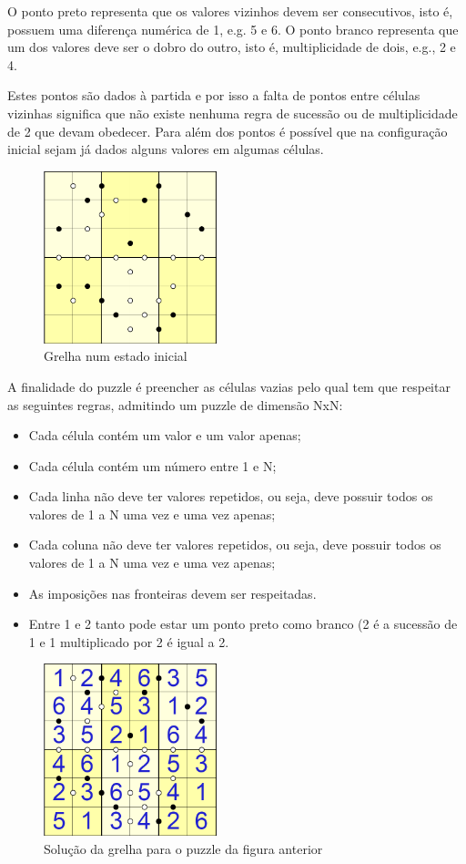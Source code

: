 \documentclass[runningheads,a4paper]{llncs}
\begin{document}
O ponto preto representa que os valores vizinhos devem ser consecutivos, isto é, possuem uma diferença numérica de 1, e.g. 5 e 6.
O ponto branco representa que um dos valores deve ser o dobro do outro, isto é, multiplicidade de dois, e.g., 2 e 4.

Estes pontos são dados à partida e por isso a falta de pontos entre células vizinhas significa que não existe nenhuma regra de sucessão ou de multiplicidade de 2 que devam obedecer. Para além dos pontos é possível que na configuração inicial sejam já dados alguns valores em algumas células.

\begin{figure}
\centering
\includegraphics[height=5cm]{res/emptyGrid}
\caption{Grelha num estado inicial}
\label{fig:emptyGrid}
\end{figure}

A finalidade do puzzle é preencher as células vazias pelo qual tem que respeitar as seguintes regras, admitindo um puzzle de dimensão NxN:
\begin{itemize}
  \item Cada célula contém um valor e um valor apenas;
  \item Cada célula contém um número entre 1 e N;
  \item Cada linha não deve ter valores repetidos, ou seja, deve possuir todos os valores de 1 a N uma vez e uma vez apenas;
  \item Cada coluna não deve ter valores repetidos, ou seja, deve possuir todos os valores de 1 a N uma vez e uma vez apenas;
  \item As imposições nas fronteiras devem ser respeitadas.
  \item Entre 1 e 2 tanto pode estar um ponto preto como branco (2 é a sucessão de 1 e 1 multiplicado por 2 é igual a 2.
\end{itemize}

\begin{figure}
\centering
\includegraphics[height=5cm]{res/filledGrid}
\caption{Solução da grelha para o puzzle da figura anterior}
\label{fig:filledGrid}
\end{figure}
\end{document}
